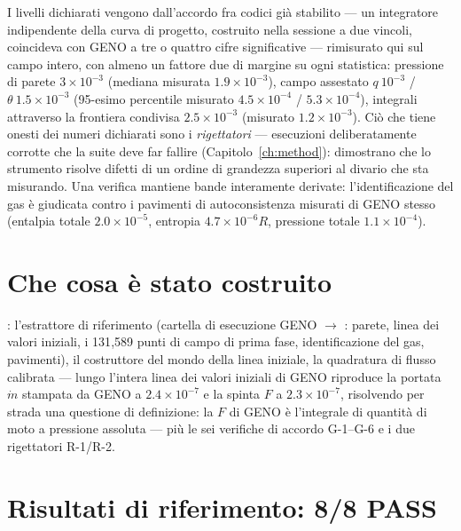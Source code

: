 I livelli dichiarati vengono dall'accordo fra codici già stabilito
--- un integratore indipendente della curva di progetto, costruito
nella sessione a due vincoli, coincideva con GENO a tre o quattro
cifre significative --- rimisurato qui sul campo intero, con almeno
un fattore due di margine su ogni statistica: pressione di parete
$3\times10^{-3}$ (mediana misurata $1.9\times10^{-3}$), campo
assestato $q\ 10^{-3}$ / $\theta\ 1.5\times10^{-3}$ (95-esimo
percentile misurato $4.5\times10^{-4}$ / $5.3\times10^{-4}$),
integrali attraverso la frontiera condivisa $2.5\times10^{-3}$
(misurato $1.2\times10^{-3}$). Ciò che tiene onesti dei numeri
dichiarati sono i \emph{rigettatori} --- esecuzioni deliberatamente
corrotte che la suite deve far fallire (Capitolo~\ref{ch:method}):
dimostrano che lo strumento risolve difetti di un ordine di
grandezza superiori al divario che sta misurando. Una verifica
mantiene bande interamente derivate: l'identificazione del gas è
giudicata contro i pavimenti di autoconsistenza misurati di GENO
stesso (entalpia totale $2.0\times10^{-5}$, entropia
$4.7\times10^{-6}R$, pressione totale $1.1\times10^{-4}$).

\section{Che cosa è stato costruito}

: l'estrattore di
riferimento (cartella di esecuzione GENO $\to$
: parete, linea dei valori iniziali, i
131{,}589 punti di campo di prima fase, identificazione del gas,
pavimenti), il costruttore del mondo della linea iniziale, la
quadratura di flusso calibrata --- lungo l'intera linea dei valori
iniziali di GENO riproduce la portata $\dot m$ stampata da GENO a
$2.4\times10^{-7}$ e la spinta $F$ a $2.3\times10^{-7}$, risolvendo
per strada una questione di definizione: la $F$ di GENO è
l'integrale di quantità di moto a pressione assoluta --- più le sei
verifiche di accordo G-1--G-6 e i due rigettatori R-1/R-2.

\section{Risultati di riferimento: 8/8 PASS}

